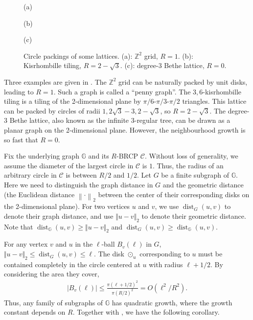 \documentclass[10pt,a4paper]{article}
\def\+#1{\mathcal{#1}}
\def\=#1{\mathbb{#1}}
\newcommand{\norm}[2]{\ensuremath{\Vert #2 \Vert_{#1}}}
\newcommand{\abs}[1]{\ensuremath{\left\vert#1\right\vert}}
\newcommand{\dist}{\operatorname{dist}}
\begin{document}
\begin{figure}
\begin{minipage}{0.32\textwidth}
{\begin{tikzpicture}
\end{tikzpicture}
}
\end{minipage}
\par
\begin{minipage}{0.32\textwidth}
\centering
\bigskip(a)
\end{minipage}
\begin{minipage}{0.32\textwidth}
\centering
\bigskip(b)
\end{minipage}
\begin{minipage}{0.32\textwidth}
\centering
\bigskip(c)
\end{minipage}

\caption{Circle packings of some lattices. (a): $\mathbb{Z}^2$ grid, $R=1$. (b): Kisrhombille tiling, $R=2-\sqrt{3}$. (c): degree-$3$ Bethe lattice, $R=0$.}
\label{fig:packing}
\end{figure}


Three examples are given in . 
The $\mathbb{Z}^2$ grid can be naturally packed by unit disks, leading to $R=1$. 
Such a graph is called a ``penny graph''. 
The $3,6$-kisrhombille tiling is a tiling of the 2-dimensional plane by $\pi/6$-$\pi/3$-$\pi/2$ triangles. 
This lattice can be packed by circles of radii $1,2\sqrt{3}-3,2-\sqrt{3}$, so $R=2-\sqrt{3}$. 
The degree-$3$ Bethe lattice, also known as the infinite $3$-regular tree, can be drawn as a planar graph on the 2-dimensional plane. 
However, the neighbourhood growth is so fast that %
$R=0$. 

Fix the underlying graph $\mathbb{G}$ and its $R$-BRCP $\mathcal{C}$. 
Without loss of generality, we assume the diameter of the largest circle in $\+C$ is $1$.
Thus, the radius of an arbitrary circle in $\+C$ is between $R/2$ and $1/2$.
Let $G$ be a finite subgraph of $\=G$.
Here we need to distinguish the graph distance in $G$ and the geometric distance (the Euclidean distance $\left\|\cdot\right\|_2$ between the center of their corresponding disks on the 2-dimensional plane).
For two vertices $u$ and $v$,
we use $\dist_G(u,v)$ to denote their graph distance,
and use $\norm{2}{u-v}$ to denote their geometric distance.
Note that $\dist_{\=G}(u,v)\ge\norm{2}{u-v}$ and $\dist_{G}(u,v)\ge\dist_{\=G}(u,v)$.

For any vertex $v$ and $u$ in the $\ell$-ball $B_v(\ell)$ in $G$,
$\norm{2}{u-v}\le\dist_G(u,v)\le \ell$.
The disk $\odot_u$ corresponding to $u$ must be contained completely in the circle centered at $u$ with radius $\ell+1/2$.
By considering the area they cover, 
\begin{align*}
  \abs{B_v(\ell)}\le \frac{\pi(\ell+1/2)^2}{\pi (R/2)^2} = O(\ell^2/R^2).
\end{align*}
Thus, any family of subgraphs of $\=G$ has quadratic growth,
where the growth constant depends on $R$.
Together with , we have the following corollary.
\end{document}
